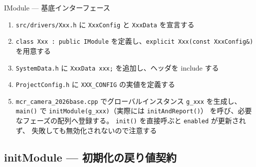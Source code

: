 \documentclass[a4paper,11pt,dvipdfmx]{jsarticle}
\begin{document}
\begin{apibox}{IModule --- 基底インターフェース}
\begin{enumerate}[nosep, leftmargin=*]
  \item \texttt{src/drivers/Xxx.h} に \texttt{XxxConfig} と \texttt{XxxData} を宣言する
  \item \texttt{class Xxx : public IModule} を定義し、\texttt{explicit Xxx(const XxxConfig\&)} を用意する
  \item \texttt{SystemData.h} に \texttt{XxxData xxx;} を追加し、ヘッダを include する
  \item \texttt{ProjectConfig.h} に \texttt{XXX\_CONFIG} の実値を定義する
  \item \texttt{mcr\_camera\_2026base.cpp} でグローバルインスタンス \texttt{g\_xxx} を生成し、
        \texttt{main()} で \texttt{initModule(g\_xxx)}（実際には \texttt{initAndReport()}）
        を呼び、必要なフェーズの配列へ登録する。
        \texttt{init()} を直接呼ぶと \texttt{enabled} が更新されず、
        失敗しても無効化されないので注意する
\end{enumerate}

\end{apibox}

\subsection{initModule --- 初期化の戻り値契約}\label{sec:api-moduleinit}
\end{document}
